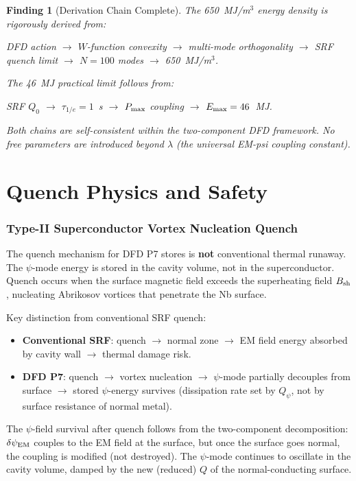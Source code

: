 \documentclass[11pt]{article}
\newtheorem{finding}{Finding}
\newcommand{\Pmax}{P_{\rm max}}
\begin{document}
\begin{finding}[Derivation Chain Complete]
\label{find:derivation}
The 650~MJ/m$^3$ energy density is rigorously derived from:
\begin{center}
DFD action $\to$ $W$-function convexity $\to$ multi-mode orthogonality
$\to$ SRF quench limit $\to$ $N = 100$ modes $\to$ 650~MJ/m$^3$.
\end{center}
The 46~MJ practical limit follows from:
\begin{center}
SRF $Q_0$ $\to$ $\tau_{1/e} = 1$~s $\to$ $\Pmax$ coupling $\to$
$E_{\rm max} = 46$~MJ.
\end{center}
Both chains are self-consistent within the two-component DFD framework.
No free parameters are introduced beyond $\lambda$ (the universal
EM-psi coupling constant).
\end{finding}

\part{Quench Physics and Safety}
\label{part:quench}

\section{Type-II Superconductor Vortex Nucleation Quench}

The quench mechanism for DFD P7 stores is \textbf{not} conventional
thermal runaway. The $\psi$-mode energy is stored in the cavity volume,
not in the superconductor. Quench occurs when the surface magnetic field
exceeds the superheating field $B_{\rm sh}$, nucleating Abrikosov
vortices that penetrate the Nb surface.

Key distinction from conventional SRF quench:
\begin{itemize}[nosep]
  \item \textbf{Conventional SRF}: quench $\to$ normal zone $\to$
    EM field energy absorbed by cavity wall $\to$ thermal damage risk.
  \item \textbf{DFD P7}: quench $\to$ vortex nucleation $\to$
    $\psi$-mode partially decouples from surface $\to$ stored
    $\psi$-energy survives (dissipation rate set by $Q_\psi$, not by
    surface resistance of normal metal).
\end{itemize}

The $\psi$-field survival after quench follows from the two-component
decomposition: $\delta\psi_{\rm EM}$ couples to the EM field at the
surface, but once the surface goes normal, the coupling is modified
(not destroyed). The $\psi$-mode continues to oscillate in the cavity
volume, damped by the new (reduced) $Q$ of the normal-conducting surface.
\end{document}
